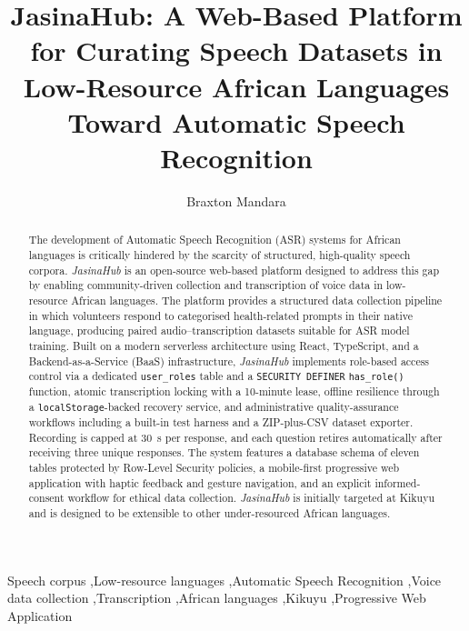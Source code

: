\documentclass[final,5p,times,twocolumn]{elsarticle}
\begin{document}
\begin{frontmatter}

\title{JasinaHub: A Web-Based Platform for Curating Speech Datasets in Low-Resource African Languages Toward Automatic Speech Recognition}

\author[dsail]{Braxton Mandara}

\address[dsail]{DSAIL Research Group, Dedan Kimathi University of Technology, Nyeri, Kenya}

\begin{abstract}
The development of Automatic Speech Recognition (ASR) systems for African languages is critically hindered by the scarcity of structured, high-quality speech corpora. \emph{JasinaHub} is an open-source web-based platform designed to address this gap by enabling community-driven collection and transcription of voice data in low-resource African languages. The platform provides a structured data collection pipeline in which volunteers respond to categorised health-related prompts in their native language, producing paired audio--transcription datasets suitable for ASR model training. Built on a modern serverless architecture using React, TypeScript, and a Backend-as-a-Service (BaaS) infrastructure, \emph{JasinaHub} implements role-based access control via a dedicated \texttt{user\_roles} table and a \texttt{SECURITY DEFINER} \texttt{has\_role()} function, atomic transcription locking with a 10-minute lease, offline resilience through a \texttt{localStorage}-backed recovery service, and administrative quality-assurance workflows including a built-in test harness and a ZIP-plus-CSV dataset exporter. Recording is capped at 30~s per response, and each question retires automatically after receiving three unique responses. The system features a database schema of eleven tables protected by Row-Level Security policies, a mobile-first progressive web application with haptic feedback and gesture navigation, and an explicit informed-consent workflow for ethical data collection. \emph{JasinaHub} is initially targeted at Kikuyu and is designed to be extensible to other under-resourced African languages.
\end{abstract}

\begin{keyword}
Speech corpus \sep Low-resource languages \sep Automatic Speech Recognition \sep Voice data collection \sep Transcription \sep African languages \sep Kikuyu \sep Progressive Web Application
\end{keyword}

\end{frontmatter}
\end{document}
